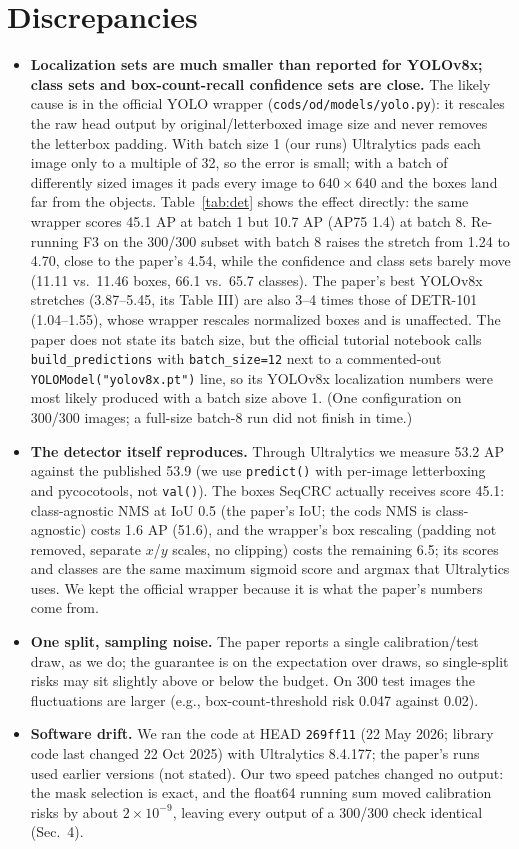 \documentclass[10pt]{article}
\begin{document}
\section{Discrepancies}\label{sec:disc}
\begin{itemize}
\item \textbf{Localization sets are much smaller than reported for YOLOv8x; class sets and box-count-recall confidence
sets are close.}
The likely cause is in the official YOLO wrapper (\texttt{cods/od/models/yolo.py}): it rescales the raw head output by
original/letterboxed image size and never removes the letterbox padding. With batch size 1 (our runs) Ultralytics pads
each image only to a multiple of 32, so the error is small; with a batch of differently sized images it pads every
image to $640\times640$ and the boxes land far from the objects. Table~\ref{tab:det} shows the effect directly: the
same wrapper scores 45.1 AP at batch 1 but 10.7 AP (AP75 1.4) at batch 8. Re-running F3 on the 300/300 subset with batch 8 raises
the stretch from 1.24 to 4.70, close to the paper's 4.54, while the confidence and class sets barely move (11.11 vs.\
11.46 boxes, 66.1 vs.\ 65.7 classes). The paper's best YOLOv8x stretches (3.87--5.45, its Table III) are also 3--4
times those of DETR-101 (1.04--1.55), whose wrapper rescales normalized boxes and is unaffected. The paper does not state
its batch size, but the official tutorial notebook calls \texttt{build\_predictions} with \texttt{batch\_size=12} next to a
commented-out \texttt{YOLOModel("yolov8x.pt")} line, so its YOLOv8x localization numbers were most likely produced with a
batch size above 1. (One configuration on 300/300 images; a full-size batch-8 run did not finish in time.)
\item \textbf{The detector itself reproduces.} Through Ultralytics we measure 53.2 AP against the published 53.9 (we use
\texttt{predict()} with per-image letterboxing and pycocotools, not \texttt{val()}). The boxes SeqCRC actually
receives score 45.1: class-agnostic NMS at IoU 0.5 (the paper's IoU; the cods NMS is class-agnostic) costs 1.6 AP (51.6), and the wrapper's
box rescaling (padding not removed, separate $x$/$y$ scales, no clipping) costs the remaining 6.5; its scores and classes
are the same maximum sigmoid score and argmax that Ultralytics uses. We kept the official wrapper because it is what the paper's numbers come from.
\item \textbf{One split, sampling noise.} The paper reports a single calibration/test draw, as we do; the guarantee is on
the expectation over draws, so single-split risks may sit slightly above or below the budget. On 300 test images the
fluctuations are larger (e.g., box-count-threshold risk 0.047 against 0.02).
\item \textbf{Software drift.} We ran the code at HEAD \texttt{269ff11} (22 May 2026; library code last changed 22 Oct
2025) with Ultralytics 8.4.177; the paper's runs used
earlier versions (not stated). Our two speed patches changed no output: the mask selection is exact, and the float64 running
sum moved calibration risks by about $2\times10^{-9}$, leaving every output of a 300/300 check identical (Sec.~4).
\end{itemize}
\end{document}
